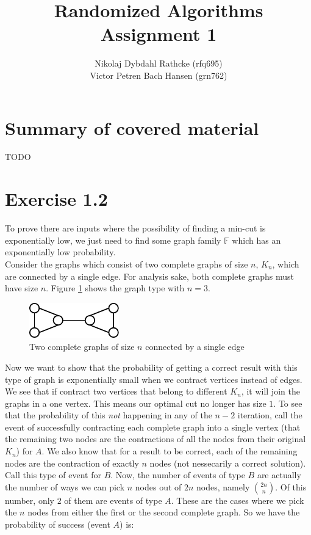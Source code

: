 \documentclass[a4paper]{article}
\author{Nikolaj Dybdahl Rathcke (rfq695) \\ Victor Petren Bach Hansen (grn762)}
\title{Randomized Algorithms \\ Assignment 1}
\begin{document}
\maketitle

\section{Summary of covered material}
TODO

\section{Exercise 1.2}
To prove there are inputs where the possibility of finding a min-cut is exponentially low, we just need to find some graph family $\mathbb{F}$ which has an exponentially low probability. \\
Consider the graphs which consist of two complete graphs of size $n$, $K_n$, which are connected by a single edge. For analysis sake, both complete graphs must have size $n$. Figure \ref{fig1} shows the graph type with $n=3$.
\begin{figure}[H]
  \centering
  \includegraphics[scale=2]{fig1.pdf}
  \caption{Two complete graphs of size $n$ connected by a single edge}
  \label{fig1}
\end{figure}
Now we want to show that the probability of getting a correct result with this type of graph is exponentially small when we contract vertices instead of edges. We see that if contract two vertices that belong to different $K_n$, it will join the graphs in a one vertex. This means our optimal cut no longer has size $1$. To see that the probability of this \textit{not} happening in any of the $n-2$ iteration, call the event of successfully contracting each complete graph into a single vertex (that the remaining two nodes are the contractions of all the nodes from their original $K_n$) for $A$. We also know that for a result to be correct, each of the remaining nodes are the contraction of exactly $n$ nodes (not nessecarily a correct solution). Call this type of event for $B$. Now, the number of events of type $B$ are actually the number of ways we can pick $n$ nodes out of $2n$ nodes, namely $\binom{2n}{n}$. Of this number, only $2$ of them are events of type $A$. These are the cases where we pick the $n$ nodes from either the first or the second complete graph. So we have the probability of success (event $A$) is:
\end{document}
